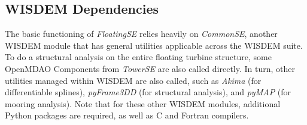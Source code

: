 \subsection{WISDEM Dependencies}
The basic functioning of \textit{FloatingSE} relies heavily on
\textit{CommonSE}, another WISDEM module that has general utilities
applicable across the WISDEM suite.  To do a structural analysis on the
entire floating turbine structure, some OpenMDAO Components from
\textit{TowerSE} are also called directly.  In turn, other utilities
managed within WISDEM are also called, such as \textit{Akima} (for
differentiable splines), \textit{pyFrame3DD} (for structural analysis),
and \textit{pyMAP} (for mooring analysis).  Note that for these other
WISDEM modules, additional Python packages are required, as well as C
and Fortran compilers.
